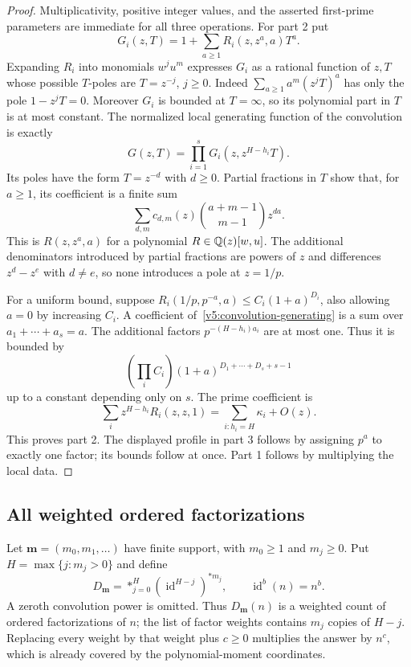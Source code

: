 \begin{proof}
Multiplicativity, positive integer values, and the asserted first-prime
parameters are immediate for all three operations.  For part 2 put
\[
 G_i(z,T)=1+\sum_{a\geq1}R_i(z,z^a,a)T^a.
\]
Expanding $R_i$ into monomials $w^j u^m$ expresses $G_i$ as a rational
function of $z,T$ whose possible $T$-poles are $T=z^{-j}$, $j\geq0$.
Indeed $\sum_{a\geq1}a^m(z^jT)^a$ has only the pole
$1-z^jT=0$.  Moreover $G_i$ is bounded at $T=\infty$, so its polynomial
part in $T$ is at most constant.  The normalized local generating function
of the convolution is exactly
\begin{equation}\label{v5:convolution-generating}
 G(z,T)=\prod_{i=1}^sG_i(z,z^{H-h_i}T).
\end{equation}
Its poles have the form $T=z^{-d}$ with $d\geq0$.  Partial fractions in
$T$ show that, for $a\geq1$, its coefficient is a finite sum
\[
 \sum_{d,m}c_{d,m}(z)\binom{a+m-1}{m-1}z^{da}.
\]
This is $R(z,z^a,a)$ for a polynomial $R\in\mathbb Q(z)[w,u]$.
The additional denominators introduced by partial fractions are powers
of $z$ and differences $z^d-z^e$ with $d\ne e$, so none introduces a
pole at $z=1/p$.

For a uniform bound, suppose
$R_i(1/p,p^{-a},a)\leq C_i(1+a)^{D_i}$, also allowing $a=0$
by increasing $C_i$.  A coefficient of~\eqref{v5:convolution-generating}
is a sum over $a_1+\cdots+a_s=a$.  The additional factors
$p^{-(H-h_i)a_i}$ are at most one.  Thus it is bounded by
\[
 \left(\prod_i C_i\right)(1+a)^{D_1+\cdots+D_s+s-1}
\]
up to a constant depending only on $s$.  The prime coefficient is
\[
 \sum_i z^{H-h_i}R_i(z,z,1)
       =\sum_{i:h_i=H}\kappa_i+O(z).
\]
This proves part 2.  The displayed profile in part 3 follows by assigning
$p^a$ to exactly one factor; its bounds follow at once.  Part 1 follows
by multiplying the local data.
\end{proof}

\subsection{All weighted ordered factorizations}

Let $\mathbf m=(m_0,m_1,\ldots)$ have finite support, with $m_0\geq1$
and $m_j\geq0$.  Put $H=\max\{j:m_j>0\}$ and define
\begin{equation}\label{v5:weighted-factorizations}
 D_{\mathbf m}=\mathop{*}_{j=0}^{H}
               (\operatorname{id}^{H-j})^{*m_j},
 \qquad \operatorname{id}^{b}(n)=n^b.
\end{equation}
A zeroth convolution power is omitted.  Thus $D_{\mathbf m}(n)$ is a
weighted count of ordered factorizations of $n$; the list of factor weights
contains $m_j$ copies of $H-j$.  Replacing every weight by that weight plus
$c\geq0$ multiplies the answer by $n^c$, which is already covered by the
polynomial-moment coordinates.

